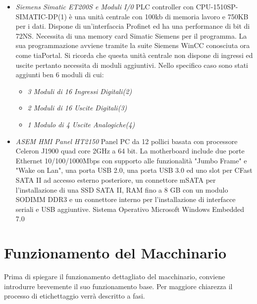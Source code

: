 \documentclass[12pt, a4paper, oneside]{book}
\begin{document}
\begin{itemize}
	\item \textit{Siemens Simatic ET200S e Moduli I/0}	
	PLC controller con CPU-1510SP-SIMATIC-DP(1) è una unità centrale con 100kb di memoria lavoro e 750KB per i dati. Dispone di un'interfaccia Profinet ed ha una performance di bit di 72NS. Necessita di una memory card Simatic Siemens per il programma.
	La sua programmazione avviene tramite la suite Siemens WinCC conosciuta ora come tiaPortal. 
	Si ricorda che questa unità centrale non dispone di ingressi ed uscite pertanto necessita di moduli aggiuntivi. Nello specifico caso sono stati aggiunti ben 6 moduli di cui:
	\begin{itemize}
		\item \textit{3 Moduli di 16 Ingressi Digitali(2)}
		\item \textit{2 Moduli di 16 Uscite Digitali(3)}
		\item \textit{1 Modulo di 4 Uscite Analogiche(4)}
	\end{itemize}

	\item \textit{ASEM HMI Panel HT2150}
	Panel PC da 12 pollici basata con processore Celeron J1900 quad core 2GHz a 64 bit.	La motherboard include due porte Ethernet 10/100/1000Mbps con supporto alle funzionalità "Jumbo Frame" e "Wake on Lan", una porta USB 2.0, una porta USB 3.0 ed uno slot per CFast SATA II ad accesso esterno posteriore, un connettore mSATA per l’installazione di una SSD SATA II, RAM fino a 8 GB con un modulo SODIMM DDR3 e un connettore interno per l’installazione di interfacce seriali e USB aggiuntive.
	Sistema Operativo Microsoft Windows Embedded 7.0
	
	
\end{itemize}

\section{Funzionamento del Macchinario}
Prima di spiegare il funzionamento dettagliato del macchinario, conviene introdurre brevemente il suo funzionamento base. Per maggiore chiarezza il processo di etichettaggio verrà descritto a fasi.
\end{document}
